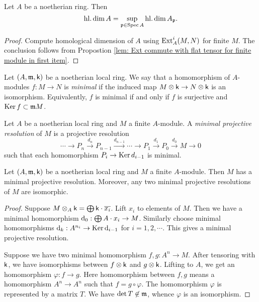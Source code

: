     \begin{proposition}\label{prop: homological dimension is local}
        Let \(A\) be a noetherian ring.
        Then 
        \[ \operatorname{hl.dim} A = \sup_{{\mathfrak{p}} \in \operatorname{Spec} A} \operatorname{hl.dim} A_{\mathfrak{p}}. \]
    \end{proposition}
    \begin{proof}
        Compute homological dimension of \(A\) using \(\operatorname{Ext}_A^i(M,N)\) for finite \(M\).
        The conclusion follows from Propostion \ref{lem: Ext commute with flat tensor for finite module in first item}.
    \end{proof}

    \begin{definition}\label{def: minimal homomorphism}
        Let \((A,{\mathfrak{m}},{\mathsf{k}})\) be a noetherian local ring.
        We say that a homomorphism of \(A\)-modules \(f: M \to N\) is \emph{minimal} 
        if the induced map \(M \otimes {\mathsf{k}} \to N \otimes {\mathsf{k}}\) is an isomorphism.
        Equivalently, \(f\) is minimal if and only if \(f\) is surjective and \(\operatorname{Ker} f \subset {\mathfrak{m}} M\).
    \end{definition}

    \begin{definition}\label{def: minimal projective resolution}
        Let \(A\) be a noetherian local ring and \(M\) a finite \(A\)-module.
        A \emph{minimal projective resolution} of \(M\) is a projective resolution
        \[ \cdots \to P_n \xrightarrow{d_n} P_{n-1} \xrightarrow{d_{n-1}} \cdots \to P_1 \xrightarrow{d_1} P_0 \xrightarrow{d_0} M \to 0 \]
        such that each homomorphism \(P_i \to \operatorname{Ker} d_{i-1}\) is minimal.
    \end{definition}

    \begin{proposition}\label{prop: minimal projective resolution exists and unique}
        Let \((A,{\mathfrak{m}},{\mathsf{k}})\) be a noetherian local ring and \(M\) a finite \(A\)-module.
        Then \(M\) has a minimal projective resolution.
        Moreover, any two minimal projective resolutions of \(M\) are isomorphic.
    \end{proposition}
    \begin{proof}
        Suppose \(M\otimes_A {\mathsf{k}} = \bigoplus {\mathsf{k}} \cdot \overline{x_i} \).
        Lift \(x_i\) to elements of \(M\).
        Then we have a minimal homomorphism \({\mathrm{d}}_0: \bigoplus A \cdot x_i \to M\).
        Similarly choose minimal homomorphisms \( {\mathrm{d}}_k: A^{n_i} \to \operatorname{Ker} {\mathrm{d}}_{i-1} \) for \(i = 1,2,\cdots\).
        This gives a minimal projective resolution.

        Suppose we have two minimal homomorphism \(f,g: A^n \to M\).
        After tensoring with \({\mathsf{k}}\), we have isomorphisms between \(f\otimes {\mathsf{k}}\) and \(g\otimes {\mathsf{k}}\).
        Lifting to $A$, we get an homomorphism \(\varphi: f \to g\).
        Here homomorphism between \(f,g\) means a homomorphism \(A^n \to A^n\) such that \(f = g \circ \varphi\).
        The homomorphism \(\varphi\) is represented by a matrix \(T\).
        We have \(\det T \not\in {\mathfrak{m}}\), whence \(\varphi\) is an isomorphism.
    \end{proof}

